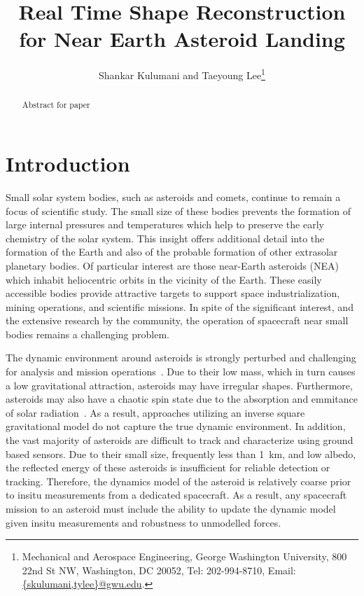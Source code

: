 \documentclass[letterpaper, paper,11pt]{AAS}		%
\begin{document}
\title{Real Time Shape Reconstruction for Near Earth Asteroid Landing}

\author{Shankar Kulumani and Taeyoung Lee\thanks{Mechanical and Aerospace Engineering, George Washington University, 800 22nd St NW, Washington, DC 20052, Tel: 202-994-8710, Email: \href{mailto:skulumani@gwu.edu}{\{skulumani,tylee\}@gwu.edu}.}
}


\maketitle{} 		

\begin{abstract}
    Abstract for paper
\end{abstract}

\section{Introduction}\label{sec:introduction}
Small solar system bodies, such as asteroids and comets, continue to remain a focus of scientific study.
The small size of these bodies prevents the formation of large internal pressures and temperatures which help to preserve the early chemistry of the solar system.
This insight offers additional detail into the formation of the Earth and also of the probable formation of other extrasolar planetary bodies.
Of particular interest are those near-Earth asteroids (NEA) which inhabit heliocentric orbits in the vicinity of the Earth. 
These easily accessible bodies provide attractive targets to support space industrialization, mining operations, and scientific missions.
In spite of the significant interest, and the extensive research by the community, the operation of spacecraft near small bodies remains a challenging problem.

The dynamic environment around asteroids is strongly perturbed and challenging for analysis and mission operations~\cite{scheeres2012}.
Due to their low mass, which in turn causes a low gravitational attraction, asteroids may have irregular shapes.
Furthermore, asteroids may also have a chaotic spin state due to the absorption and emmitance of solar radiation~\cite{rubincam2000}.
As a result, approaches utilizing an inverse square gravitational model do not capture the  true dynamic environment.
In addition, the vast majority of asteroids are difficult to track and characterize using ground based sensors.
Due to their small size, frequently less than \SI{1}{\kilo\meter}, and low albedo, the reflected energy of these asteroids is insufficient for reliable detection or tracking.
Therefore, the dynamics model of the asteroid is relatively coarse prior to insitu measurements from a dedicated spacecraft.
As a result, any spacecraft mission to an asteroid must include the ability to update the dynamic model given insitu measurements and robustness to unmodelled forces.
\end{document}
